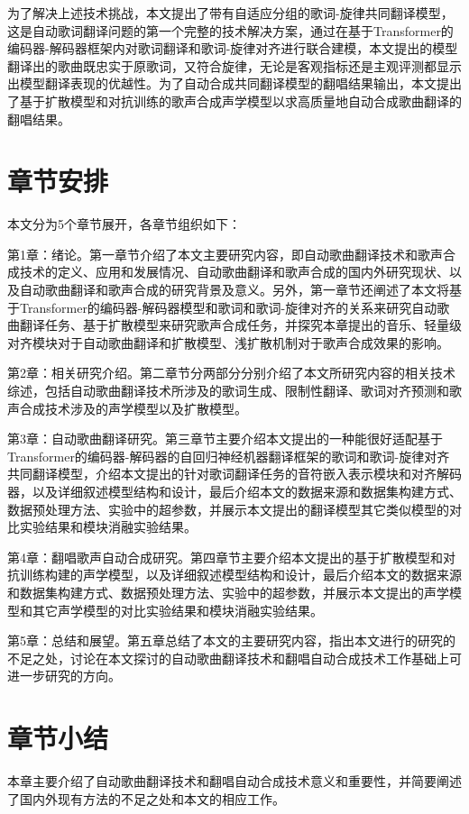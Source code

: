 为了解决上述技术挑战，本文提出了带有自适应分组的歌词-旋律共同翻译模型，这是自动歌词翻译问题的第一个完整的技术解决方案，通过在基于Transformer的编码器-解码器框架内对歌词翻译和歌词-旋律对齐进行联合建模，本文提出的模型翻译出的歌曲既忠实于原歌词，又符合旋律，无论是客观指标还是主观评测都显示出模型翻译表现的优越性。为了自动合成共同翻译模型的翻唱结果输出，本文提出了基于扩散模型和对抗训练的歌声合成声学模型以求高质量地自动合成歌曲翻译的翻唱结果。
\section{章节安排}
本文分为5个章节展开，各章节组织如下：

第1章：绪论。第一章节介绍了本文主要研究内容，即自动歌曲翻译技术和歌声合成技术的定义、应用和发展情况、自动歌曲翻译和歌声合成的国内外研究现状、以及自动歌曲翻译和歌声合成的研究背景及意义。另外，第一章节还阐述了本文将基于Transformer的编码器-解码器模型和歌词和歌词-旋律对齐的关系来研究自动歌曲翻译任务、基于扩散模型来研究歌声合成任务，并探究本章提出的音乐、轻量级对齐模块对于自动歌曲翻译和扩散模型、浅扩散机制对于歌声合成效果的影响。

第2章：相关研究介绍。第二章节分两部分分别介绍了本文所研究内容的相关技术综述，包括自动歌曲翻译技术所涉及的歌词生成、限制性翻译、歌词对齐预测和歌声合成技术涉及的声学模型以及扩散模型。

第3章：自动歌曲翻译研究。第三章节主要介绍本文提出的一种能很好适配基于Transformer的编码器-解码器的自回归神经机器翻译框架的歌词和歌词-旋律对齐共同翻译模型，介绍本文提出的针对歌词翻译任务的音符嵌入表示模块和对齐解码器，以及详细叙述模型结构和设计，最后介绍本文的数据来源和数据集构建方式、数据预处理方法、实验中的超参数，并展示本文提出的翻译模型其它类似模型的对比实验结果和模块消融实验结果。

第4章：翻唱歌声自动合成研究。第四章节主要介绍本文提出的基于扩散模型和对抗训练构建的声学模型，以及详细叙述模型结构和设计，最后介绍本文的数据来源和数据集构建方式、数据预处理方法、实验中的超参数，并展示本文提出的声学模型和其它声学模型的对比实验结果和模块消融实验结果。

第5章：总结和展望。第五章总结了本文的主要研究内容，指出本文进行的研究的不足之处，讨论在本文探讨的自动歌曲翻译技术和翻唱自动合成技术工作基础上可进一步研究的方向。
\section{章节小结}
本章主要介绍了自动歌曲翻译技术和翻唱自动合成技术意义和重要性，并简要阐述了国内外现有方法的不足之处和本文的相应工作。
